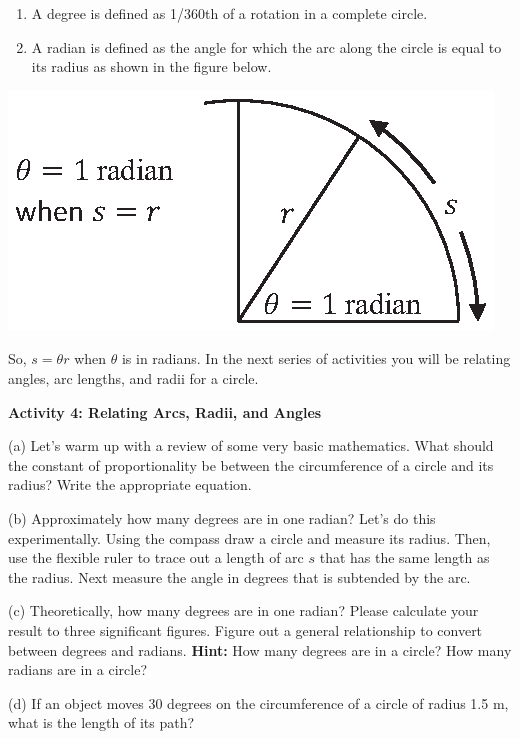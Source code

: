 \begin{enumerate}
\item A degree is defined as 1/360th of a rotation in a complete circle.
\pagebreak[2]
\item A radian is defined as the angle for which the arc along the circle is equal to its radius as shown in the figure below.
\end{enumerate}
\vspace{0.3cm}
{\par\centering \includegraphics{rotation/one_radian.eps} \par}
\vspace{0.3cm}

So, \(s = \theta r \) when \( \theta \) is in radians. \hfill \break
In the next series of activities you will be relating angles, arc lengths, and
radii for a circle.


\textbf{Activity 4: Relating Arcs, Radii, and Angles} 

(a) Let's warm up with a review of some very basic mathematics. What should
the constant of proportionality be between the circumference of a circle and
its radius? Write the appropriate equation.
\answerspace{10mm}

(b) Approximately how many degrees are in one radian? Let's do this experimentally.
Using the compass draw a circle and measure its radius. Then, use the flexible
ruler to trace out a length of arc $s$ that has the same length as the radius.
Next measure the angle in degrees that is subtended by the arc.
\answerspace{30mm}

(c) Theoretically, how many degrees are in one radian? Please calculate your
result to three significant figures. Figure out a general relationship to convert between degrees and radians. \textbf{Hint:} How many degrees are in a circle?  How many radians are in a circle?
\answerspace{20mm}

(d) If an object moves 30 degrees on the circumference of a circle of radius
1.5 m, what is the length of its path?
\answerspace{20mm}

